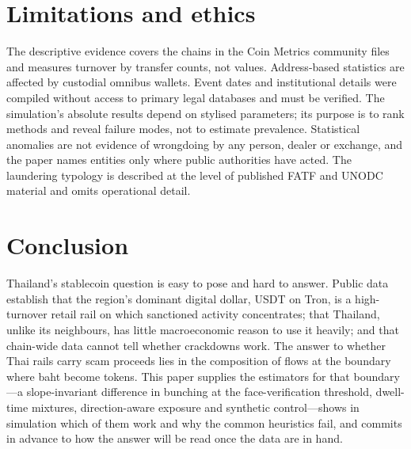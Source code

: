 \section{Limitations and ethics}\label{sec:limits}

The descriptive evidence covers the chains in the Coin Metrics community files and measures turnover by transfer
counts, not values. Address-based statistics are affected by custodial omnibus wallets. Event dates and institutional
details were compiled without access to primary legal databases and must be verified. The simulation's absolute
results depend on stylised parameters; its purpose is to rank methods and reveal failure modes, not to estimate
prevalence. Statistical anomalies are not evidence of wrongdoing by any person, dealer or exchange, and the paper names
entities only where public authorities have acted. The laundering typology is described at the level of published
FATF and UNODC material and omits operational detail.

\section{Conclusion}\label{sec:conclusion}

Thailand's stablecoin question is easy to pose and hard to answer. Public data establish that the region's dominant
digital dollar, USDT on Tron, is a high-turnover retail rail on which sanctioned activity concentrates; that Thailand,
unlike its neighbours, has little macroeconomic reason to use it heavily; and that chain-wide data cannot tell whether
crackdowns work. The answer to whether Thai rails carry scam proceeds lies in the composition of flows at the boundary
where baht become tokens. This paper supplies the estimators for that boundary---a slope-invariant difference in
bunching at the face-verification threshold, dwell-time mixtures, direction-aware exposure and synthetic control---shows
in simulation which of them work and why the common heuristics fail, and commits in advance to how the answer will be
read once the data are in hand.
